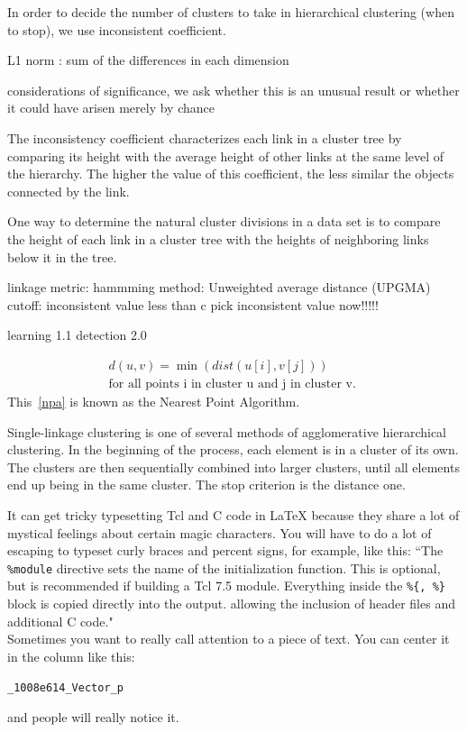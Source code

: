 In order to decide the number of clusters to take in hierarchical clustering
(when to stop), we use inconsistent coefficient.


L1 norm : sum of the differences in
each dimension

considerations of significance, we ask whether this is an unusual result or
whether it could have arisen merely by chance


The inconsistency coefficient characterizes each link in a cluster tree by
comparing its height with the average height of other links at the same level of
the hierarchy. The higher the value of this coefficient, the less similar the
objects connected by the link.

One way to determine the natural cluster divisions in a data set is to compare
the height of each link in a cluster tree with the heights of neighboring links
below it in the tree.

linkage metric: hammming
method: Unweighted average distance (UPGMA)
cutoff: inconsistent value less than c
pick inconsistent value now!!!!!

learning 1.1
detection 2.0


\begin{gather*} \label{npa}
  d(u,v) = \min(dist(u[i],v[j])) \\
  \text{for all points i in cluster u and j in
  cluster v. }
\end{gather*}
This~\autoref{npa} is known as the Nearest Point Algorithm.

Single-linkage clustering is one of several methods of agglomerative
hierarchical clustering. In the beginning of the process, each element is in a
cluster of its own. The clusters are then sequentially combined into larger
clusters, until all elements end up being in the same cluster. The stop
criterion is the distance one.




It can get tricky typesetting Tcl and C code in LaTeX because they share
a lot of mystical feelings about certain magic characters.  You
will have to do a lot of escaping to typeset curly braces and percent
signs, for example, like this:
``The {\tt \%module} directive
sets the name of the initialization function.  This is optional, but is
recommended if building a Tcl 7.5 module.
Everything inside the {\tt \%\{, \%\}}
block is copied directly into the output. allowing the inclusion of
header files and additional C code." \\

Sometimes you want to really call attention to a piece of text.  You
can center it in the column like this:
\begin{center}
  {\tt \_1008e614\_Vector\_p}
\end{center}
and people will really notice it.\\

